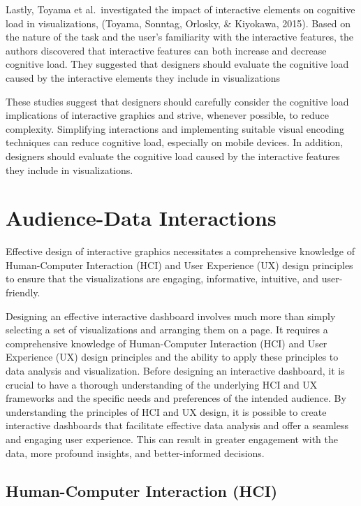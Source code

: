 \documentclass[print]{nuthesis}
\begin{document}
Lastly, Toyama et al.~investigated the impact of interactive elements on cognitive load in visualizations, (Toyama, Sonntag, Orlosky, \& Kiyokawa, 2015).
Based on the nature of the task and the user's familiarity with the interactive features, the authors discovered that interactive features can both increase and decrease cognitive load.
They suggested that designers should evaluate the cognitive load caused by the interactive elements they include in visualizations

These studies suggest that designers should carefully consider the cognitive load implications of interactive graphics and strive, whenever possible, to reduce complexity.
Simplifying interactions and implementing suitable visual encoding techniques can reduce cognitive load, especially on mobile devices.
In addition, designers should evaluate the cognitive load caused by the interactive features they include in visualizations.

\hypertarget{audience-data-interactions}{%
\section{Audience-Data Interactions}\label{audience-data-interactions}}

Effective design of interactive graphics necessitates a comprehensive knowledge of Human-Computer Interaction (HCI) and User Experience (UX) design principles to ensure that the visualizations are engaging, informative, intuitive, and user-friendly.

Designing an effective interactive dashboard involves much more than simply selecting a set of visualizations and arranging them on a page.
It requires a comprehensive knowledge of Human-Computer Interaction (HCI) and User Experience (UX) design principles and the ability to apply these principles to data analysis and visualization.
Before designing an interactive dashboard, it is crucial to have a thorough understanding of the underlying HCI and UX frameworks and the specific needs and preferences of the intended audience.
By understanding the principles of HCI and UX design, it is possible to create interactive dashboards that facilitate effective data analysis and offer a seamless and engaging user experience.
This can result in greater engagement with the data, more profound insights, and better-informed decisions.

\hypertarget{human-computer-interaction-hci}{%
\subsection{Human-Computer Interaction (HCI)}\label{human-computer-interaction-hci}}
\end{document}
